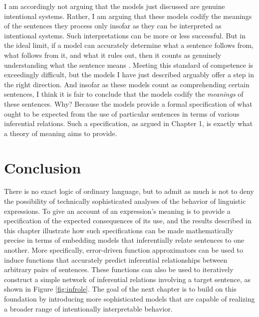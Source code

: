 I am accordingly not arguing that the models just discussed are genuine intentional systems. Rather, I am arguing that these models codify the meanings of the sentences they process only insofar as they can be interpreted as intentional systems. Such interpretations can be more or less successful. But in the ideal limit, if a model can accurately determine what a sentence follows from, what follows from it, and what it rules out, then it counts as genuinely understanding what the sentence means \citep{Brandom:1994}. Meeting this standard of competence is exceedingly difficult, but the models I have just described arguably offer a step in the right direction. And insofar as these models count as comprehending certain sentences, I think it is fair to conclude that the models codify the \textit{meanings} of these sentences. Why? Because the models provide a formal specification of what ought to be expected from the use of particular sentences in terms of various inferential relations. Such a specification, as argued in Chapter 1, is exactly what a theory of meaning aims to provide.

\section{Conclusion}

There is no exact logic of ordinary language, but to admit as much is not to deny the possibility of technically sophisticated analyses of the behavior of linguistic expressions. To give an account of an expression's meaning is to provide a specification of the expected consequences of its use, and the results described in this chapter illustrate how such specifications can be made mathematically precise in terms of embedding models that inferentially relate sentences to one another. More specifically, error-driven function approximators can be used to induce functions that accurately predict inferential relationships between arbitrary pairs of sentences. These functions can also be used to iteratively construct a simple network of inferential relations involving a target sentence, as shown in Figure \ref{fig:infrole}. The goal of the next chapter is to build on this foundation by introducing more sophisticated models that are capable of realizing a broader range of intentionally interpretable behavior. 